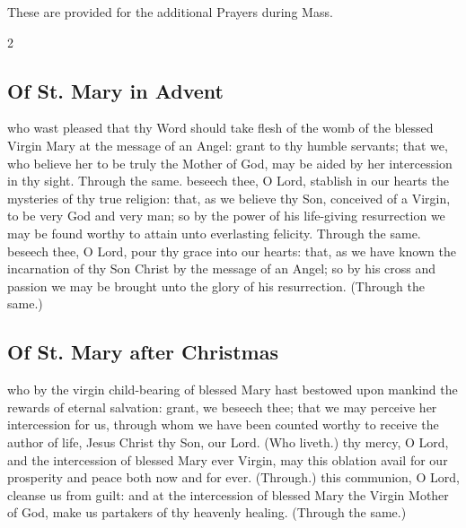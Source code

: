    \fancyhead[RO,LE]{}
   \fancyhead[RE,LO]{}
\begin{secrubric}
	These are provided for the additional Prayers during Mass.
\end{secrubric}\label{SeasonalPrayers}

   \begin{multicols}{2}
   \subsection{Of St. Mary in Advent}\label{SPMaryInAdvent}
   \collect
    who wast pleased that thy Word should take flesh of the womb of the blessed Virgin Mary at the message of an Angel: grant to thy humble servants; that we, who believe her to be truly the Mother of God, may be aided by her intercession in thy sight. Through the same.
   \secret
    beseech thee, O Lord, stablish in our hearts the mysteries of thy true religion: that, as we believe thy Son, conceived of a Virgin, to be very God and very man; so by the power of his life-giving resurrection we may be found worthy to attain unto everlasting felicity. Through the same.
   \postcommunion
    beseech thee, O Lord, pour thy grace into our hearts: that, as we have known the incarnation of thy Son Christ by the message of an Angel; so by his cross and passion we may be brought unto the glory of his resurrection. (Through the same.)
   
   \newcolumn

    \subsection{Of St. Mary after Christmas}\label{SPMaryPostChristmas}
    \collect
     who by the virgin child-bearing of blessed Mary hast bestowed upon mankind the rewards of eternal salvation: grant, we beseech thee; that we may perceive her intercession for us, through whom we have been counted worthy to receive the author of life, Jesus Christ thy Son, our Lord. (Who liveth.)
    \secret
     thy mercy, O Lord, and the intercession of blessed Mary ever Virgin, may this oblation avail for our prosperity and peace both now and for ever. (Through.)
    \postcommunion
     this communion, O Lord, cleanse us from guilt: and at the intercession of blessed Mary the Virgin Mother of God, make us partakers of thy heavenly healing. (Through the same.)
    

\end{multicols}
